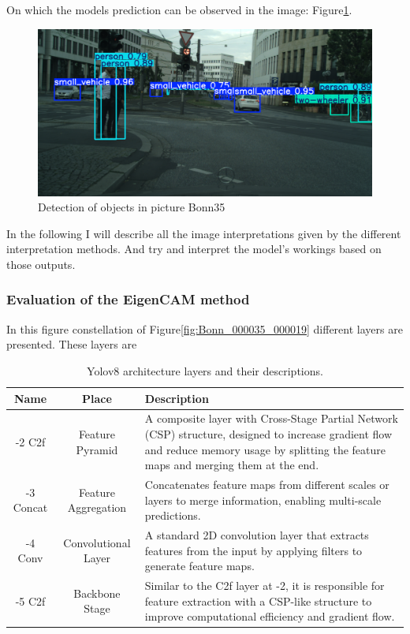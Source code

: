 On which the models prediction can be observed in the image: Figure\ref{fig:detbonn35}.
\begin{figure}[h]
    \centering
    \includegraphics[width=1\linewidth]{figures/bonn_000035_000019_leftImg8bit}
    \caption{Detection of objects in picture Bonn35 }
    \label{fig:detbonn35}
\end{figure}

In the following I will describe all the image interpretations given by the different interpretation methods. And try and interpret the model's workings based on those outputs.


\subsubsection{Evaluation of the EigenCAM method}\label{subsubsec:evaluation-of-the-eigencam-method}

In this figure constellation of Figure\ref{fig:Bonn_000035_000019} different layers are presented.
These layers are

\begin{table}[h]
    \centering
    \begin{tabular}{|c|c|p{10cm}|}
        \hline
        \textbf{Name} & \textbf{Place} & \textbf{Description} \\
         \hline
         -2 C2f  & Feature Pyramid & A composite layer with Cross-Stage Partial Network (CSP) structure, designed to increase gradient flow and reduce memory usage by splitting the feature maps and merging them at the end. \\
         \hline
         -3 Concat & Feature Aggregation & Concatenates feature maps from different scales or layers to merge information, enabling multi-scale predictions. \\
         \hline
         -4 Conv & Convolutional Layer & A standard 2D convolution layer that extracts features from the input by applying filters to generate feature maps. \\
         \hline
         -5 C2f  & Backbone Stage & Similar to the C2f layer at -2, it is responsible for feature extraction with a CSP-like structure to improve computational efficiency and gradient flow. \\
         \hline
    \end{tabular}
    \caption{Yolov8 architecture layers and their descriptions.}
    \label{tab:yolov8_layers}
\end{table}

